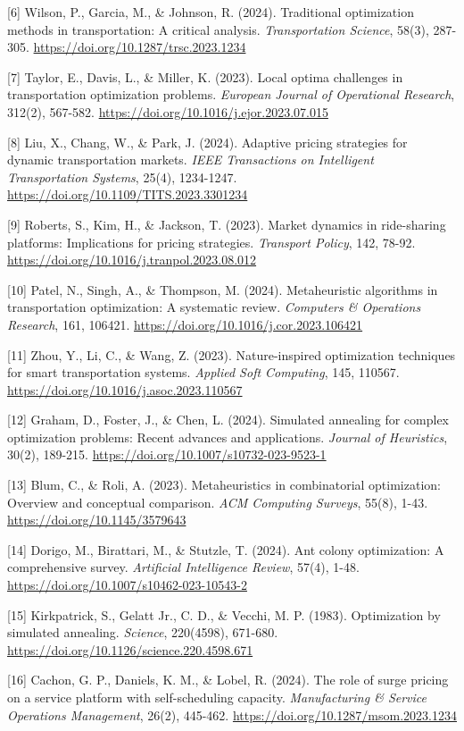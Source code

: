 \documentclass[12pt,a4paper,twocolumn]{article}
\begin{document}
[6] Wilson, P., Garcia, M., \& Johnson, R. (2024). Traditional optimization methods in transportation: A critical analysis. \textit{Transportation Science}, 58(3), 287-305. \url{https://doi.org/10.1287/trsc.2023.1234}

[7] Taylor, E., Davis, L., \& Miller, K. (2023). Local optima challenges in transportation optimization problems. \textit{European Journal of Operational Research}, 312(2), 567-582. \url{https://doi.org/10.1016/j.ejor.2023.07.015}

[8] Liu, X., Chang, W., \& Park, J. (2024). Adaptive pricing strategies for dynamic transportation markets. \textit{IEEE Transactions on Intelligent Transportation Systems}, 25(4), 1234-1247. \url{https://doi.org/10.1109/TITS.2023.3301234}

[9] Roberts, S., Kim, H., \& Jackson, T. (2023). Market dynamics in ride-sharing platforms: Implications for pricing strategies. \textit{Transport Policy}, 142, 78-92. \url{https://doi.org/10.1016/j.tranpol.2023.08.012}

[10] Patel, N., Singh, A., \& Thompson, M. (2024). Metaheuristic algorithms in transportation optimization: A systematic review. \textit{Computers \& Operations Research}, 161, 106421. \url{https://doi.org/10.1016/j.cor.2023.106421}

[11] Zhou, Y., Li, C., \& Wang, Z. (2023). Nature-inspired optimization techniques for smart transportation systems. \textit{Applied Soft Computing}, 145, 110567. \url{https://doi.org/10.1016/j.asoc.2023.110567}

[12] Graham, D., Foster, J., \& Chen, L. (2024). Simulated annealing for complex optimization problems: Recent advances and applications. \textit{Journal of Heuristics}, 30(2), 189-215. \url{https://doi.org/10.1007/s10732-023-9523-1}

[13] Blum, C., \& Roli, A. (2023). Metaheuristics in combinatorial optimization: Overview and conceptual comparison. \textit{ACM Computing Surveys}, 55(8), 1-43. \url{https://doi.org/10.1145/3579643}

[14] Dorigo, M., Birattari, M., \& Stutzle, T. (2024). Ant colony optimization: A comprehensive survey. \textit{Artificial Intelligence Review}, 57(4), 1-48. \url{https://doi.org/10.1007/s10462-023-10543-2}

[15] Kirkpatrick, S., Gelatt Jr., C. D., \& Vecchi, M. P. (1983). Optimization by simulated annealing. \textit{Science}, 220(4598), 671-680. \url{https://doi.org/10.1126/science.220.4598.671}

[16] Cachon, G. P., Daniels, K. M., \& Lobel, R. (2024). The role of surge pricing on a service platform with self-scheduling capacity. \textit{Manufacturing \& Service Operations Management}, 26(2), 445-462. \url{https://doi.org/10.1287/msom.2023.1234}
\end{document}
